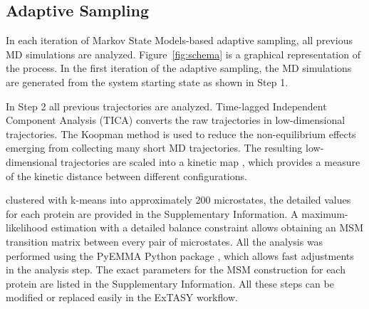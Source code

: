 \subsection{\label{sec:adaptive-sampling} Adaptive Sampling}

In each iteration of Markov State Models-based adaptive sampling, all previous
MD simulations are analyzed.
Figure~\ref{fig:schema} is a graphical representation of the process. In the
first iteration of the adaptive sampling, the MD simulations are generated from
the system starting state as shown in Step 1.

In Step 2 all previous trajectories are analyzed.  Time-lagged
Independent Component Analysis (TICA) \cite{TICA1-perez2013, TICA2-schwantes2013} converts the raw trajectories in
low-dimensional trajectories. The Koopman method \cite{koopmanold,
koopman2,koopman3,koopman4, wu2017variational, Nueske2017} is used to reduce
the non-equilibrium effects emerging from collecting many short MD trajectories. The
resulting low-dimensional trajectories are scaled into a kinetic map
\cite{Noe2015,noe2016commute}, which provides a measure of the kinetic distance
between different configurations.  

 clustered with k-means into approximately 200 microstates,
the detailed values for each protein are provided in the Supplementary Information. 
A  maximum-likelihood estimation with a detailed balance
constraint \cite{prinz2011markov} allows obtaining an MSM transition matrix 
between every pair of microstates. All the analysis was
performed using the PyEMMA Python package \cite{scherer2015pyemma}, which
allows fast adjustments in the analysis step. The exact parameters for the MSM
construction for each protein are listed in the
Supplementary Information. All these steps can be modified or replaced easily in the
ExTASY workflow. 

